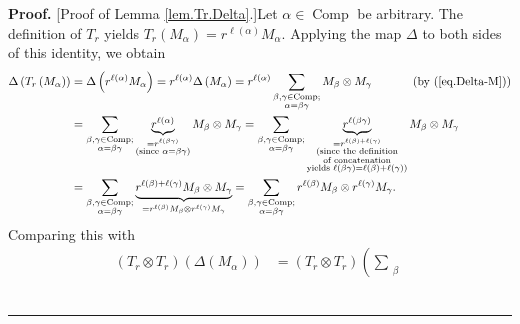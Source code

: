 \documentclass[numbers=enddot,12pt,final,onecolumn,notitlepage]{scrartcl}%
\theoremstyle{definition}
\newenvironment{proof}[1][Proof]{\noindent\textbf{#1.} }{\ \rule{0.5em}{0.5em}}
\let\sumnonlimits\sum
\renewcommand{\sum}{\sumnonlimits\limits}
\newenvironment{vershort}{}{}
\begin{document}
\begin{vershort}


\begin{proof}
[Proof of Lemma \ref{lem.Tr.Delta}.]Let $\alpha\in\operatorname*{Comp}$ be
arbitrary. The definition of $T_{r}$ yields $T_{r}\left(  M_{\alpha}\right)
=r^{\ell\left(  \alpha\right)  }M_{\alpha}$. Applying the map $\Delta$ to both
sides of this identity, we obtain%
\begin{align*}
\Delta\left(  T_{r}\left(  M_{\alpha}\right)  \right)   &  =\Delta\left(
r^{\ell\left(  \alpha\right)  }M_{\alpha}\right)  =r^{\ell\left(
\alpha\right)  }\Delta\left(  M_{\alpha}\right)  =r^{\ell\left(
\alpha\right)  }\sum_{\substack{\beta,\gamma\in\operatorname*{Comp}%
;\\\alpha=\beta\gamma}}M_{\beta}\otimes M_{\gamma}\ \ \ \ \ \ \ \ \ \ \left(
\text{by (\ref{eq.Delta-M})}\right) \\
&  =\sum_{\substack{\beta,\gamma\in\operatorname*{Comp};\\\alpha=\beta\gamma
}}\underbrace{r^{\ell\left(  \alpha\right)  }}_{\substack{=r^{\ell\left(
\beta\gamma\right)  }\\\text{(since }\alpha=\beta\gamma\text{)}}}M_{\beta
}\otimes M_{\gamma}=\sum_{\substack{\beta,\gamma\in\operatorname*{Comp}%
;\\\alpha=\beta\gamma}}\underbrace{r^{\ell\left(  \beta\gamma\right)  }%
}_{\substack{=r^{\ell\left(  \beta\right)  +\ell\left(  \gamma\right)
}\\\text{(since the definition}\\\text{of concatenation}\\\text{yields }%
\ell\left(  \beta\gamma\right)  =\ell\left(  \beta\right)  +\ell\left(
\gamma\right)  \text{)}}}M_{\beta}\otimes M_{\gamma}\\
&  =\sum_{\substack{\beta,\gamma\in\operatorname*{Comp};\\\alpha=\beta\gamma
}}\underbrace{r^{\ell\left(  \beta\right)  +\ell\left(  \gamma\right)
}M_{\beta}\otimes M_{\gamma}}_{=r^{\ell\left(  \beta\right)  }M_{\beta}\otimes
r^{\ell\left(  \gamma\right)  }M_{\gamma}}=\sum_{\substack{\beta,\gamma
\in\operatorname*{Comp};\\\alpha=\beta\gamma}}r^{\ell\left(  \beta\right)
}M_{\beta}\otimes r^{\ell\left(  \gamma\right)  }M_{\gamma}.
\end{align*}
Comparing this with%
\begin{align*}
\left(  T_{r}\otimes T_{r}\right)  \left(  \Delta\left(  M_{\alpha}\right)
\right)   &  =\left(  T_{r}\otimes T_{r}\right)  \left(  \sum_{\substack{\beta
}}
\end{align*}
\end{proof}
\end{vershort}
\end{document}
